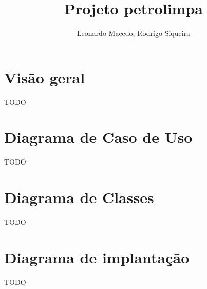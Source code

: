 \documentclass[a4paper,10pt]{article}
\title{Projeto petrolimpa}
\author{Leonardo Macedo, Rodrigo Siqueira}
\begin{document}
 	\maketitle
 	\titlepage
 	\tableofcontents

\newpage
\section{Visão geral}
TODO

\newpage
\section{Diagrama de Caso de Uso}
	TODO

\newpage
\section{Diagrama de Classes}
	TODO

\newpage
\section{Diagrama de implantação}
TODO
\end{document}
